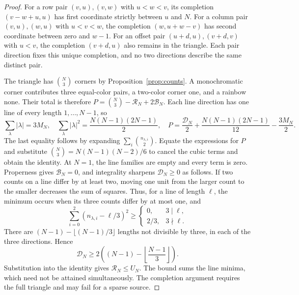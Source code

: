 \documentclass[11pt,a4paper]{article}
\theoremstyle{definition}
\numberwithin{equation}{section}
\begin{document}
\begin{proof}
	For a row pair $(v,u),(v,w)$ with $u<w<v$, its completion $(v-w+u,u)$ has first coordinate strictly between $u$ and $N$. For a column pair $(v,u),(w,u)$ with $u<v<w$, the completion $(w,u+w-v)$ has second coordinate between zero and $w-1$. For an offset pair $(u+d,u),(v+d,v)$ with $u<v$, the completion $(v+d,u)$ also remains in the triangle. Each pair direction fixes this unique completion, and no two directions describe the same distinct pair.
	
	The triangle has $\binom N3$ corners by Proposition~\ref{prop:counts}. A monochromatic corner contributes three equal-color pairs, a two-color corner one, and a rainbow none. Their total is therefore $P=\binom N3-\mathcal R_N+2\mathcal B_N$. Each line direction has one line of every length $1,\ldots,N-1$, so
	\[
	\sum_\lambda|\lambda|=3M_N,\quad
	\sum_\lambda|\lambda|^2=\frac{N(N-1)(2N-1)}2,\quad
	P=\frac{\mathcal D_N}{2}+\frac{N(N-1)(2N-1)}{12}-\frac{3M_N}{2}.
	\]
	The last equality follows by expanding $\sum_i\binom{n_{\lambda,i}}2$. Equate the expressions for $P$ and substitute $\binom N3=N(N-1)(N-2)/6$ to cancel the cubic terms and obtain the identity. At $N=1$, the line families are empty and every term is zero. Properness gives $\mathcal B_N=0$, and integrality sharpens $\mathcal D_N\ge0$ as follows. If two counts on a line differ by at least two, moving one unit from the larger count to the smaller decreases the sum of squares. Thus, for a line of length $\ell$, the minimum occurs when its three counts differ by at most one, and
	\[
	\sum_{i=0}^2(n_{\lambda,i}-\ell/3)^2\ge
	\begin{cases}
		0,&3\mid\ell,\\
		2/3,&3\nmid\ell.
	\end{cases}
	\]
	There are $(N-1)-\lfloor(N-1)/3\rfloor$ lengths not divisible by three, in each of the three directions. Hence
	\[
	\mathcal D_N\ge2\left((N-1)-\left\lfloor\frac{N-1}{3}\right\rfloor\right).
	\]
	Substitution into the identity gives $\mathcal R_N\le U_N$. The bound sums the line minima, which need not be attained simultaneously. The completion argument requires the full triangle and may fail for a sparse source.
\end{proof}
\end{document}
